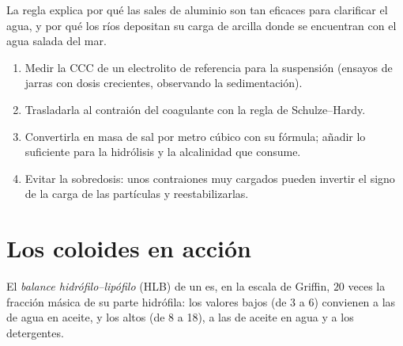 La regla explica por qué las sales de aluminio son tan eficaces para clarificar el agua, y
por qué los ríos depositan su carga de arcilla donde se encuentran con el agua salada del mar.

\begin{method}\label{met:b3:colloids:coagulant-dose}
\begin{enumerate}
  \item Medir la CCC de un electrolito de referencia para la suspensión (ensayos de jarras
        con dosis crecientes, observando la sedimentación).
  \item Trasladarla al contraión del coagulante con la regla de Schulze--Hardy.
  \item Convertirla en masa de sal por metro cúbico con su fórmula; añadir lo suficiente
        para la hidrólisis y la alcalinidad que consume.
  \item Evitar la sobredosis: unos contraiones muy cargados pueden invertir el signo de
        la carga de las partículas y reestabilizarlas.
\end{enumerate}
\end{method}

\section{Los coloides en acción}

\begin{definition}\label{def:b3:colloids:hlb}
El \emph{balance hidrófilo--lipófilo}
(HLB) de un  es, en la escala de Griffin, $20$ veces la fracción
másica de su parte hidrófila: los valores bajos (de 3 a 6) convienen a las  de agua
en aceite, y los altos (de 8 a 18), a las  de aceite en agua y a los detergentes.
\end{definition}

